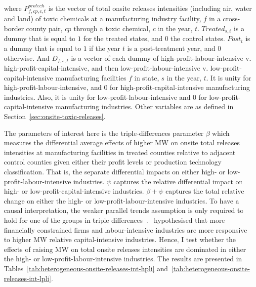 \documentclass{C:/Users/david/OneDrive/Documents/ULMS/PhD/Thesis/chapter3/src/climate_change/latex/Economic_Journal/OUP-EJ}
\begin{document}
    where $P_{f,cp,c,t}^{protech}$ is the vector of total onsite releases intensities (including air, water and land) of toxic chemicals at a manufacturing industry facility, $f$ in a cross-border county pair, $cp$ through a toxic chemical, $c$ in the year, $t$. $Treated_{s,t}$ is a dummy that is equal to $1$ for the treated states, and $0$ the control states. $Post_{t}$ is a dummy that is equal to $1$ if the year $t$ is a post-treatment year, and $0$ otherwise. And $D_{f,s,t}$ is a vector of each dummy of high-profit-labour-intensive v. high-profit-capital-intensive, and then low-profit-labour-intensive v. low-profit-capital-intensive manufacturing facilities $f$ in state, $s$ in the year, $t$. It is unity for high-profit-labour-intensive, and $0$ for high-profit-capital-intensive manufacturing industries. Also, it is unity for low-profit-labour-intensive and $0$ for low-profit-capital-intensive manufacturing industries. Other variables are as defined in Section~\ref{sec:onsite-toxic-releases}.

    The parameters of interest here is the triple-differences parameter $\beta$ which measures the differential average effects of higher MW on onsite total releases intensities at manufacturing facilities in treated counties relative to adjacent control counties given either their profit levels or production technology classification. That is, the separate differential impacts on either high- or low-profit-labour-intensive industries. $\psi$ captures the relative differential impact on high- or low-profit-capital-intensive industries. $\beta + \psi$ captures the total relative change on either the high- or low-profit-labour-intensive industries. To have a causal interpretation, the weaker parallel trends assumption is only required to hold for one of the groups in triple differences~\citep{olden2022triple}.~\citet{zhang2023unintended} hypothesised that more financially constrained firms and labour-intensive industries are more responsive to higher MW relative capital-intensive industries. Hence, I test whether the effects of raising MW on total onsite releases intensities are dominated in either the high- or low-profit-labour-intensive industries. The results are presented in Tables~\ref{tab:heterogeneous-onsite-releases-int-hpli} and~\ref{tab:heterogeneous-onsite-releases-int-lpli}.
\end{document}
